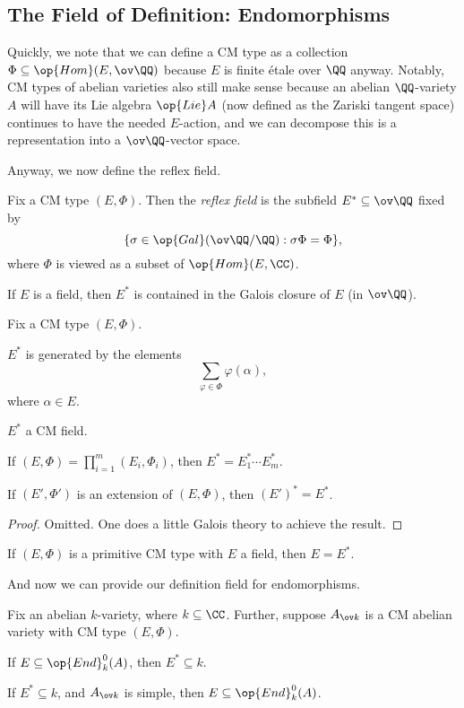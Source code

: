 \documentclass[../notes.tex]{subfiles}
\begin{document}
\subsection{The Field of Definition: Endomorphisms}
Quickly, we note that we can define a CM type as a collection $\Phi\subseteq\op{Hom}(E,\ov\QQ)$ because $E$ is finite \'etale over $\QQ$ anyway. Notably, CM types of abelian varieties also still make sense because an abelian $\QQ$-variety $A$ will have its Lie algebra $\op{Lie}A$ (now defined as the Zariski tangent space) continues to have the needed $E$-action, and we can decompose this is a representation into a $\ov\QQ$-vector space.

Anyway, we now define the reflex field.
\begin{definition}
	Fix a CM type $(E,\Phi)$. Then the \textit{reflex field} is the subfield $E^*\subseteq\ov\QQ$ fixed by
	\[\{\sigma\in\op{Gal}(\ov\QQ/\QQ):\sigma\Phi=\Phi\},\]
	where $\Phi$ is viewed as a subset of $\op{Hom}(E,\CC)$.
\end{definition}
\begin{remark}
	If $E$ is a field, then $E^*$ is contained in the Galois closure of $E$ (in $\ov\QQ$).
\end{remark}
\begin{lemma} \label{lem:how-to-reflex}
	Fix a CM type $(E,\Phi)$.
	\begin{listalph}
		\item $E^*$ is generated by the elements
		\[\sum_{\varphi\in\Phi}\varphi(\alpha),\]
		where $\alpha\in E$.
		\item $E^*$ a CM field.
		\item If $(E,\Phi)=\prod_{i=1}^m(E_i,\Phi_i)$, then $E^*=E_1^*\cdots E_m^*$.
		\item If $(E',\Phi')$ is an extension of $(E,\Phi)$, then $(E')^*=E^*$.
	\end{listalph}
\end{lemma}
\begin{proof}
	Omitted. One does a little Galois theory to achieve the result.
\end{proof}
\begin{example}
	If $(E,\Phi)$ is a primitive CM type with $E$ a field, then $E=E^*$.
\end{example}
And now we can provide our definition field for endomorphisms.
\begin{proposition}
	Fix an abelian $k$-variety, where $k\subseteq\CC$. Further, suppose $A_{\ov k}$ is a CM abelian variety with CM type $(E,\Phi)$.
	\begin{listalph}
		\item If $E\subseteq\op{End}^0_k(A)$, then $E^*\subseteq k$.
		\item If $E^*\subseteq k$, and $A_{\ov k}$ is simple, then $E\subseteq\op{End}^0_k(A)$.
	\end{listalph}
\end{proposition}
\end{document}
